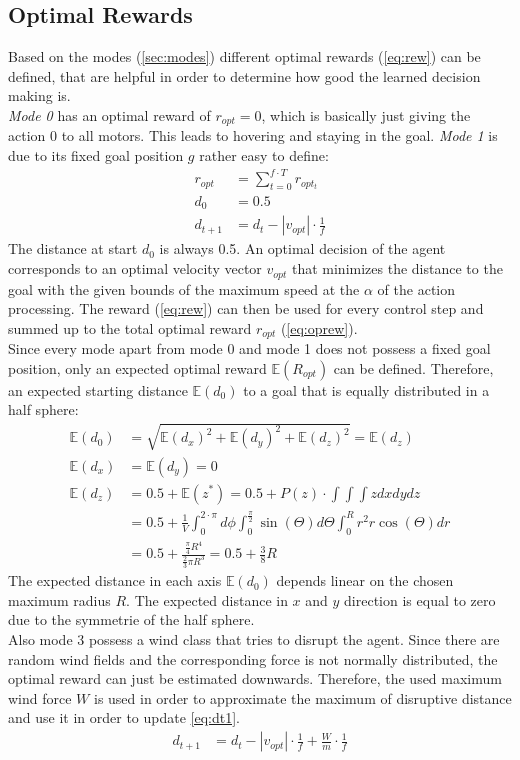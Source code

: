\subsection{Optimal Rewards}
Based on the modes (\cref{sec:modes}) different optimal rewards (\cref{eq:rew}) can be defined, that are helpful in order to determine how good the learned decision making is.\\
\emph{Mode 0} has an optimal reward of $r_{opt} = 0$, which is basically just giving the action $0$ to all motors. This leads to hovering and staying in the goal.
\emph{Mode 1} is due to its fixed goal position $g$ rather easy to define:
\begin{align}
r_{opt} &= \sum_{t=0}^{f \cdot T}  r_{opt_t} \label{eq:oprew}\\
d_0 &= 0.5\\
d_{t+1} &= d_t - |v_{opt}| \cdot \frac{1}{f} \label{eq:dt1}%
\end{align}
The distance at start $d_0$ is always 0.5. An optimal decision of the agent corresponds to an optimal velocity vector $v_{opt}$ that minimizes the distance to the goal with the given bounds of the maximum speed at the $\alpha$ of the action processing. The reward (\cref{eq:rew}) can then be used for every control step and summed up to the total optimal reward $r_{opt}$ (\cref{eq:oprew}).\\
Since every mode apart from mode 0 and mode 1 does not possess a fixed goal position, only an expected optimal reward $\mathbb{E}(R_{opt})$ can be defined. Therefore, an expected starting distance $\mathbb{E}(d_0)$ to a goal that is equally distributed in a half sphere:
\begin{align}
	\mathbb{E}(d_0) &= \sqrt{\mathbb{E}(d_x)^2 + \mathbb{E}(d_y)^2 + \mathbb{E}(d_z)^2}  = \mathbb{E}(d_z) \\
	\mathbb{E}(d_x) &= \mathbb{E}(d_y) = 0\\
	\mathbb{E}(d_z) &= 0.5 + \mathbb{E}(z^*) = 0.5 + P(z) \cdot \int \int \int  z dx dy dz \nonumber \\
	&= 0.5 + \frac{1}{V} \int_{0}^{2 \cdot \pi} d \phi \int_{0}^{\frac{\pi}{2}} \sin(\Theta) d\Theta \int_{0}^{R} r^2 r \cos(\Theta)  dr  \nonumber \\
	&= 0.5 + \frac{\frac{\pi}{4} R^4}{\frac{2}{3} \pi R^3} = 0.5 + \frac{3}{8} R
\end{align}
The expected distance in each axis $\mathbb{E}(d_0)$ depends linear on the chosen maximum radius $R$. The expected distance in $x$ and $y$ direction is equal to zero due to the symmetrie of the half sphere.\\
Also mode 3 possess a wind class that tries to disrupt the agent. Since there are random wind fields and the corresponding force is not normally distributed, the optimal reward can just be estimated downwards. Therefore, the used maximum wind force $W$ is used in order to approximate the maximum of disruptive distance and use it in order to update \cref{eq:dt1}.
\begin{align}
	d_{t+1} &= d_t - | v_{opt} | \cdot \frac{1}{f} + \frac{W}{m} \cdot \frac{1}{f}
\end{align}
\newpage


